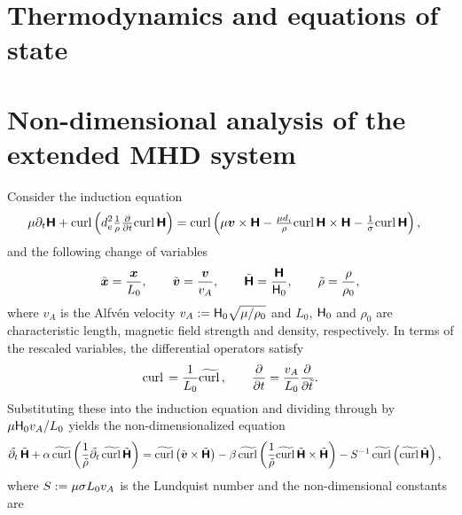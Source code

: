 \documentclass[preprint,1p]{elsarticle}
\begin{document}
\newpage
\begin{appendix}

\section{Thermodynamics and equations of state}

\section{Non-dimensional analysis of the extended MHD system}

Consider the induction equation
\begin{align*}
    \mu \partial_t \boldsymbol{\mathsf{H}}
+ \text{curl} \, \mathbf{}\!\left(d_e^2 \tfrac{1}{\rho} \tfrac{\partial}{\partial t}\text{curl} \, \mathbf{}\boldsymbol{\mathsf{H}}\right)
&= \text{curl} \, \mathbf{}\!\left(\mu \boldsymbol{v} \times \boldsymbol{\mathsf{H}}
- \tfrac{\mu d_i}{\rho} \text{curl} \, \mathbf{}\boldsymbol{\mathsf{H}} \times \boldsymbol{\mathsf{H}}
- \tfrac{1}{\sigma} \text{curl} \, \mathbf{}\boldsymbol{\mathsf{H}}\right),
\end{align*}
and the following change of variables
\begin{align*}
    \Tilde{\boldsymbol{x}} = \frac{\boldsymbol{x}}{L_0}, \qquad \Tilde{\boldsymbol{v}}=\frac{\boldsymbol{v}}{v_A}, \qquad \Tilde{\boldsymbol{\mathsf{H}}}=\frac{\boldsymbol{\mathsf{H}}}{{\mathsf{H}}_0}, \qquad \Tilde{\rho}=\frac{\rho}{\rho_0},
\end{align*}
where $v_A$ is the Alfv\'en velocity $v_A:={\mathsf{H}}_0\sqrt{\mu/\rho_0}$ and $L_0$, ${\mathsf{H}}_0$ and $\rho_0$ are characteristic length, magnetic field strength and density, respectively. In terms of the rescaled variables, the differential operators satisfy
\begin{align*}
    \text{curl} \, \mathbf{} = \frac{1}{L_0}\widetilde{\text{curl} \, \mathbf{}}, \qquad \frac{\partial}{\partial t}=\frac{v_A}{L_0}\frac{\partial}{\partial \Tilde{t}}.
\end{align*}
Substituting these into the induction equation and dividing through by $\mu {\mathsf{H}}_0 v_A / L_0$ yields the non-dimensionalized equation
\begin{align*}
    \Tilde{\partial_t}\,\Tilde{\boldsymbol{\mathsf{H}}}
+ \alpha\,\widetilde{\text{curl} \, \mathbf{}}\!\left(
    \frac{1}{\Tilde{\rho}}
    \Tilde{\partial_t}\,
    \widetilde{\text{curl} \, \mathbf{}}\Tilde{\boldsymbol{\mathsf{H}}}
\right)
&=
\widetilde{\text{curl} \, \mathbf{}}\!\left(
    \Tilde{\boldsymbol{v}}\times\Tilde{\boldsymbol{\mathsf{H}}}
\right)
-
\beta\,\widetilde{\text{curl} \, \mathbf{}}\!\left(
    \frac{1}{\Tilde{\rho}}
    \widetilde{\text{curl} \, \mathbf{}}\Tilde{\boldsymbol{\mathsf{H}}}
    \times
    \Tilde{\boldsymbol{\mathsf{H}}}
\right)
-
S^{-1}\,\widetilde{\text{curl} \, \mathbf{}}\!\left(
    \widetilde{\text{curl} \, \mathbf{}}\Tilde{\boldsymbol{\mathsf{H}}}
\right),
\end{align*}
where $S:=\mu\sigma L_0 v_A$ is the Lundquist number and the non-dimensional constants are

\end{appendix}
\end{document}
